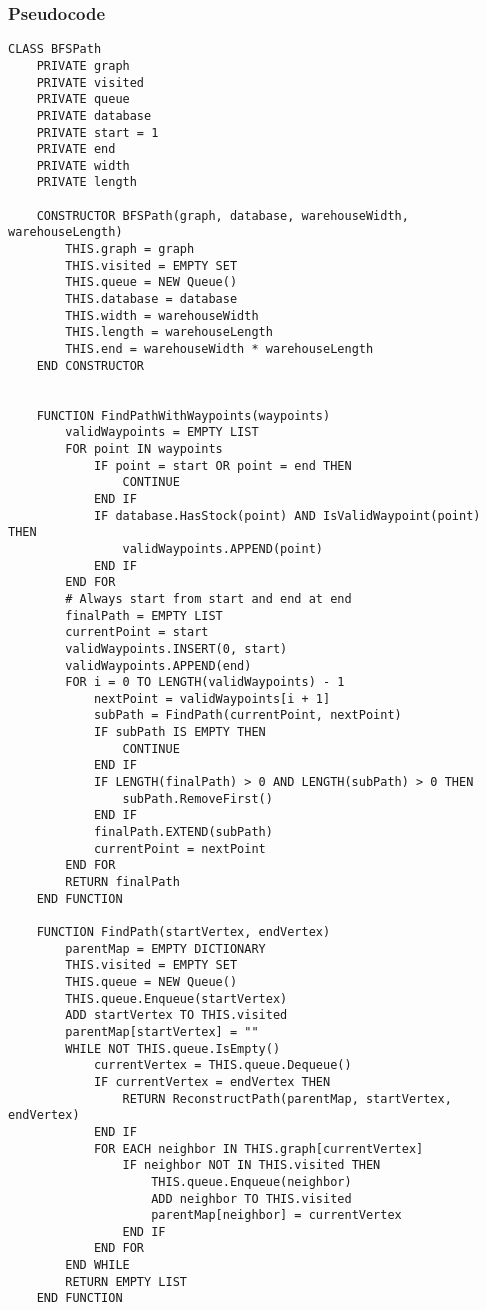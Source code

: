 \newpage
\subsubsection{Pseudocode}

\begin{verbatim}
CLASS BFSPath
    PRIVATE graph
    PRIVATE visited
    PRIVATE queue
    PRIVATE database
    PRIVATE start = 1
    PRIVATE end
    PRIVATE width
    PRIVATE length

    CONSTRUCTOR BFSPath(graph, database, warehouseWidth, warehouseLength)
        THIS.graph = graph
        THIS.visited = EMPTY SET
        THIS.queue = NEW Queue()
        THIS.database = database
        THIS.width = warehouseWidth
        THIS.length = warehouseLength
        THIS.end = warehouseWidth * warehouseLength
    END CONSTRUCTOR


    FUNCTION FindPathWithWaypoints(waypoints)
        validWaypoints = EMPTY LIST
        FOR point IN waypoints
            IF point = start OR point = end THEN
                CONTINUE
            END IF
            IF database.HasStock(point) AND IsValidWaypoint(point) THEN
                validWaypoints.APPEND(point)
            END IF
        END FOR
        # Always start from start and end at end
        finalPath = EMPTY LIST
        currentPoint = start
        validWaypoints.INSERT(0, start)
        validWaypoints.APPEND(end)
        FOR i = 0 TO LENGTH(validWaypoints) - 1
            nextPoint = validWaypoints[i + 1]
            subPath = FindPath(currentPoint, nextPoint)
            IF subPath IS EMPTY THEN
                CONTINUE
            END IF
            IF LENGTH(finalPath) > 0 AND LENGTH(subPath) > 0 THEN
                subPath.RemoveFirst()
            END IF
            finalPath.EXTEND(subPath)
            currentPoint = nextPoint
        END FOR
        RETURN finalPath
    END FUNCTION

    FUNCTION FindPath(startVertex, endVertex)
        parentMap = EMPTY DICTIONARY
        THIS.visited = EMPTY SET
        THIS.queue = NEW Queue()
        THIS.queue.Enqueue(startVertex)
        ADD startVertex TO THIS.visited
        parentMap[startVertex] = ""
        WHILE NOT THIS.queue.IsEmpty()
            currentVertex = THIS.queue.Dequeue()
            IF currentVertex = endVertex THEN
                RETURN ReconstructPath(parentMap, startVertex, endVertex)
            END IF
            FOR EACH neighbor IN THIS.graph[currentVertex]
                IF neighbor NOT IN THIS.visited THEN
                    THIS.queue.Enqueue(neighbor)
                    ADD neighbor TO THIS.visited
                    parentMap[neighbor] = currentVertex
                END IF
            END FOR
        END WHILE
        RETURN EMPTY LIST
    END FUNCTION


\end{verbatim}
